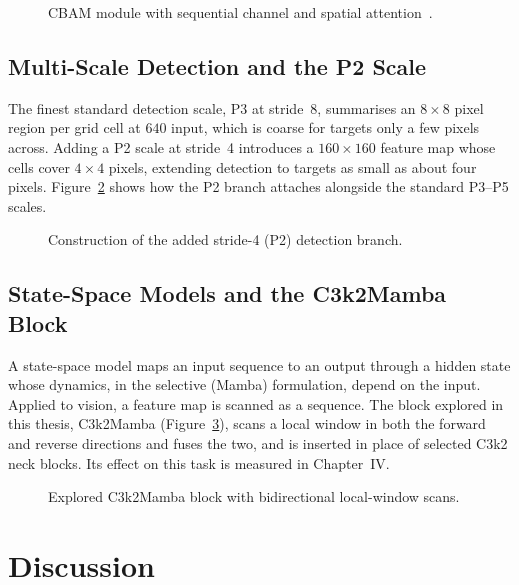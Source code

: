\begin{figure}[H]
  \centering
  \caption{CBAM module with sequential channel and spatial attention~\cite{woo2018cbam}.}
  \label{fig:cbam}
\end{figure}

\subsection{Multi-Scale Detection and the P2 Scale}
The finest standard detection scale, P3 at stride~8, summarises an $8\times8$ pixel
region per grid cell at $640$ input, which is coarse for targets only a few pixels
across. Adding a P2 scale at stride~4 introduces a $160\times160$ feature map whose
cells cover $4\times4$ pixels, extending detection to targets as small as about
four pixels. Figure~\ref{fig:p2} shows how the P2 branch attaches alongside the
standard P3--P5 scales.

\begin{figure}[H]
  \centering
  \caption{Construction of the added stride-4 (P2) detection branch.}
  \label{fig:p2}
\end{figure}

\subsection{State-Space Models and the C3k2Mamba Block}
A state-space model maps an input sequence to an output through a hidden state
whose dynamics, in the selective (Mamba) formulation, depend on the input. Applied
to vision, a feature map is scanned as a sequence. The block explored in this
thesis, C3k2Mamba (Figure~\ref{fig:mamba}), scans a local window in both the forward
and reverse directions and fuses the two, and is inserted in place of selected C3k2
neck blocks. Its effect on this task is measured in Chapter~IV.

\begin{figure}[H]
  \centering
  \caption{Explored C3k2Mamba block with bidirectional local-window scans.}
  \label{fig:mamba}
\end{figure}

\section{Discussion}

